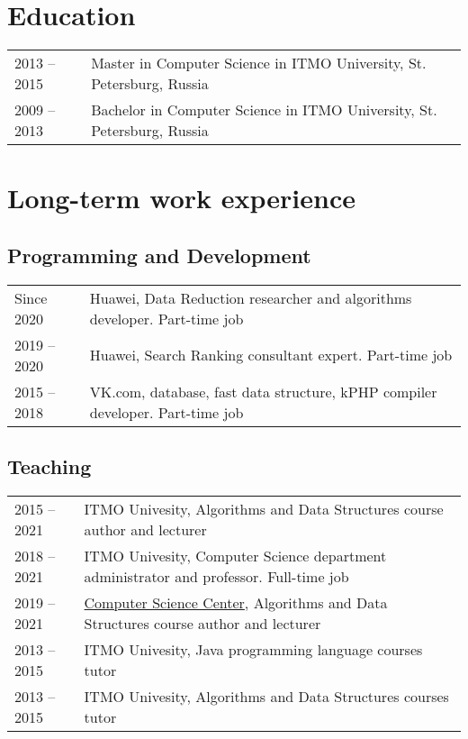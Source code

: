 \documentclass[11pt,a4paper,oneside]{article}
\begin{document}
\section{Education}
  \begin{tabular}{l|p{15 cm}}
    2013 -- 2015 & Master in Computer Science in ITMO University, St. Petersburg, Russia \\
    2009 -- 2013 & Bachelor in Computer Science in ITMO University, St. Petersburg, Russia \\
  \end{tabular}

\section{Long-term work experience}

\subsection{Programming and Development}
  \begin{tabular}{l|p{15 cm}}
    Since 2020 & Huawei, Data Reduction researcher and algorithms developer. Part-time job \\
    2019 -- 2020 & Huawei, Search Ranking consultant expert. Part-time job \\
    2015 -- 2018 & VK.com, database, fast data structure, kPHP compiler developer. Part-time job \\
  \end{tabular}

\subsection{Teaching}
  \begin{tabular}{l|p{15 cm}}
    2015 -- 2021 & ITMO Univesity, Algorithms and Data Structures course author and lecturer \\
    2018 -- 2021 & ITMO Univesity, Computer Science department administrator and professor. Full-time job \\
    2019 -- 2021 & \href{https://compscicenter.ru/}{Computer Science Center}, Algorithms and Data Structures course author and lecturer \\
    2013 -- 2015 & ITMO Univesity, Java programming language courses tutor \\
    2013 -- 2015 & ITMO Univesity, Algorithms and Data Structures courses tutor \\
  \end{tabular}
\end{document}
